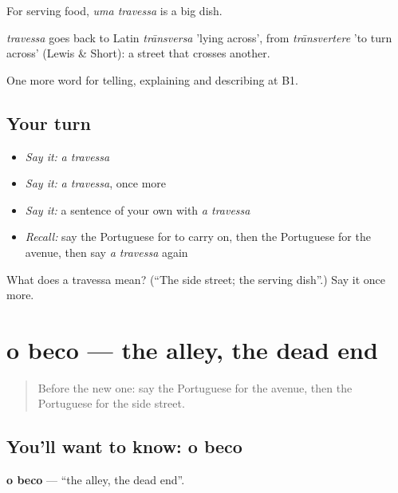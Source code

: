 For serving food, \emph{uma travessa} is a big dish.

\begin{cousinweb}
\emph{travessa} goes back to Latin \emph{trānsversa} 'lying across', from \emph{trānsvertere} 'to turn across' (Lewis \& Short): a street that crosses another.
\end{cousinweb}

\begin{grammarlens}[title={What you've built}]
One more word for telling, explaining and describing at B1.
\end{grammarlens}

\subsection*{Your turn}
\begin{itemize}
\raggedright
  \item \emph{Say it:} \emph{a travessa}
  \item \emph{Say it:} \emph{a travessa}, once more
  \item \emph{Say it:} a sentence of your own with \emph{a travessa}
  \item \emph{Recall:} say the Portuguese for to carry on, then the Portuguese for the avenue, then say \emph{a travessa} again
\end{itemize}

\begin{tcolorbox}[breakable,colback=teal!4,colframe=teal!35!black,title={Before you move on}]
What does a travessa mean? (\textquotedblleft{}The side street; the serving dish\textquotedblright{}.) Say it once more.
\end{tcolorbox}
\section[o beco]{o beco — the alley, the dead end}

\label{lesson:PT-C437-beco}



\begin{quote}
Before the new one: say the Portuguese for the avenue, then the Portuguese for the side street.
\end{quote}

\subsection*{You'll want to know: o beco}
\textbf{o beco} — \textquotedblleft{}the alley, the dead end\textquotedblright{}.

